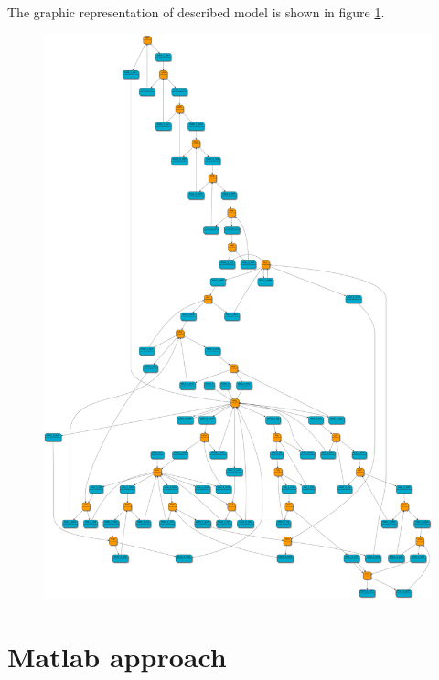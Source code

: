 \documentclass[a4paper]{article}
\begin{document}
The graphic representation of described model is shown in figure \ref{fig:img4}.\\

\begin{figure}[h]
\centering
\includegraphics[scale=0.12]{schemas/img4.png}
\caption{\label{fig:img4}}
\end{figure}

\clearpage

%
\section{Matlab approach}

\end{document}
